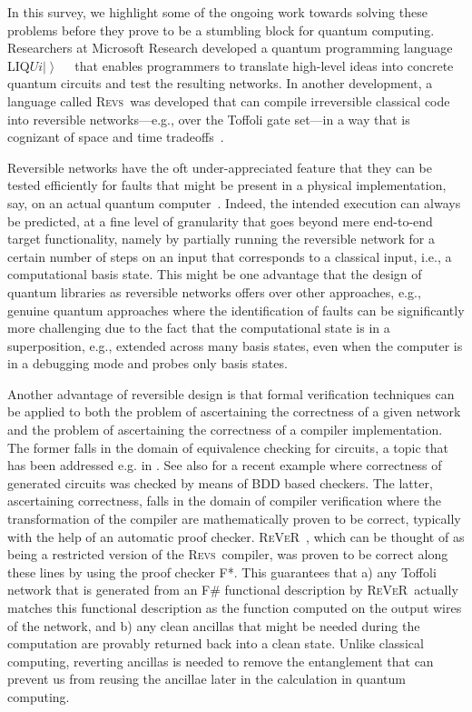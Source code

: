 \documentclass[conference]{IEEEtran}
\newcommand{\ket}[1]{\left| #1\right\rangle}        %
\newcommand{\Liquid}{LIQ$Ui\ket{}$\ }
\newcommand{\REVS}{{\textsc{Revs}}}
\newcommand{\REVER}{{\textsc{ReVeR}}}
\begin{document}
In this survey, we highlight some of the ongoing work towards solving these problems before they prove to be a stumbling block for quantum computing. Researchers at Microsoft Research developed a quantum programming language \Liquid~\cite{WS:2014} that enables programmers to translate high-level ideas into concrete quantum circuits and test the resulting networks. In another development, a language called \REVS~was developed that can compile irreversible classical code into reversible networks---e.g., over the Toffoli gate set---in a way that is cognizant of space and time tradeoffs~\cite{PRS15}. 

Reversible networks have the oft under-appreciated feature that they can be tested efficiently for faults that might be present in a physical implementation, say, on an actual quantum computer~\cite{HRS16}. Indeed, the intended execution can always be predicted, at a fine level of granularity that goes beyond mere end-to-end target functionality, namely by partially running the reversible network for a certain number of steps on an input that corresponds to a classical input, i.e., a computational basis state. This might be one advantage that the design of quantum libraries as reversible networks offers over other approaches, e.g., genuine quantum approaches where the identification of faults can be significantly more challenging due to the fact that the computational state is in a superposition, e.g., extended across many basis states, even when the computer is in a debugging mode and probes only basis states. 

Another advantage of reversible design is that formal verification techniques can be applied to both the problem of ascertaining the correctness of a given network and the problem of ascertaining the correctness of a compiler implementation. The former falls in the domain of equivalence checking for circuits, a topic that has been addressed e.g. in \cite{VMH:2007}. See also \cite{SRWD:2017} for a recent example where correctness of generated circuits was checked by means of BDD based checkers.  The latter, ascertaining correctness, falls in the domain of compiler verification where the transformation of the compiler are mathematically proven to be correct, typically with the help of an automatic proof checker. \REVER~\cite{ARS16}, which can be thought of as being a restricted version of the \REVS~compiler, was proven to be correct along these lines by using the proof checker F*.  This guarantees that a) any Toffoli network that is generated from an F\# functional description by \REVER~actually matches this functional description as the function computed on the output wires of the network, and b) any clean ancillas that might be needed during the computation are provably returned back into a clean state. Unlike classical computing, reverting ancillas is needed to remove the entanglement that can prevent us from reusing the ancillae later in the calculation in quantum computing.
\end{document}
